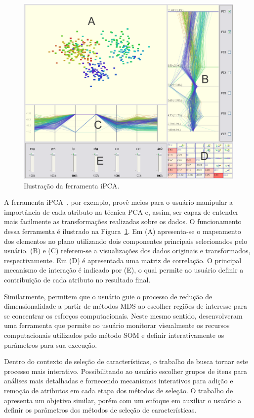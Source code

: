 \begin{figure}[h!]
    \centering
    \includegraphics[width=12cm]{images/ipca.png}
    \caption[iPCA]{Ilustração da ferramenta iPCA.}
    \label{fig:ipca}
\end{figure}

A ferramenta iPCA~\cite{Jeong2009}, por exemplo, provê meios
para o usuário manipular a importância de cada atributo na
técnica PCA e, assim, ser capaz de entender mais facilmente as 
transformações realizadas sobre os dados. O funcionamento
dessa ferramenta é ilustrado na Figura~\ref{fig:ipca}. Em
(A) apresenta-se o mapeamento dos elementos no plano
utilizando dois componentes principais selecionados pelo
usuário. (B) e (C) referem-se a visualizações dos dados
originais e transformados, respectivamente. Em (D) é
apresentada uma matriz de correlação. O principal mecanismo
de interação é indicado por (E), o qual permite ao usuário
definir a contribuição de cada atributo no resultado final.

Similarmente, \citet{Williams2004}
permitem que o usuário guie o processo de redução de
dimensionalidade a partir de métodos MDS ao escolher regiões
de interesse para se concentrar os esforços computacionais.
Neste mesmo sentido, \citet{Schreck2008} desenvolveram uma
ferramenta que permite ao usuário monitorar visualmente os
recursos computacionais utilizados pelo método SOM e definir
interativamente os parâmetros para sua execução.

Dentro do contexto de seleção de características, o trabalho
de \citet{Dy2000} busca tornar este processo mais interativo.
Possibilitando ao usuário escolher grupos de itens para
análises mais detalhadas e fornecendo mecanismos interativos
para adição e remoção de atributos em cada etapa dos métodos
de seleção. O trabalho de \citet{Brandoli2010} apresenta um
objetivo similar, porém com um enfoque em auxiliar o
usuário a definir os parâmetros dos métodos de seleção de
características.

